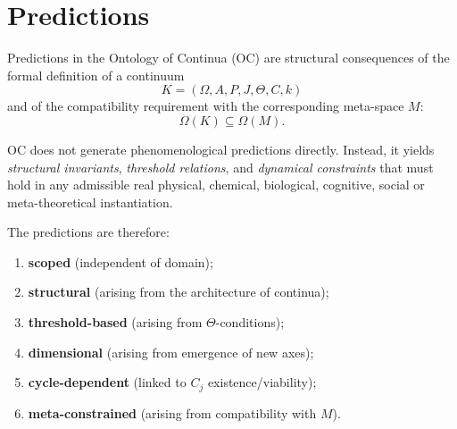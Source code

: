 

\section{Predictions}
\label{sec:predictions-master}

Predictions in the Ontology of Continua (OC) are structural consequences  
of the formal definition of a continuum
\[
K = (\Omega, A, P, J, \Theta, C, k)
\]
and of the compatibility requirement with the corresponding meta-space $M$:
\[
\Omega(K) \subseteq \Omega(M).
\]

OC does not generate phenomenological predictions directly.  
Instead, it yields \emph{structural invariants},  
\emph{threshold relations}, and \emph{dynamical constraints}  
that must hold in any admissible real physical, chemical, biological,  
cognitive, social or meta-theoretical instantiation.

The predictions are therefore:

\begin{enumerate}
    \item \textbf{scoped} (independent of domain);
    \item \textbf{structural} (arising from the architecture of continua);
    \item \textbf{threshold-based} (arising from $\Theta$-conditions);
    \item \textbf{dimensional} (arising from emergence of new axes);
    \item \textbf{cycle-dependent} (linked to $C_j$ existence/viability);
    \item \textbf{meta-constrained} (arising from compatibility with $M$).
\end{enumerate}

